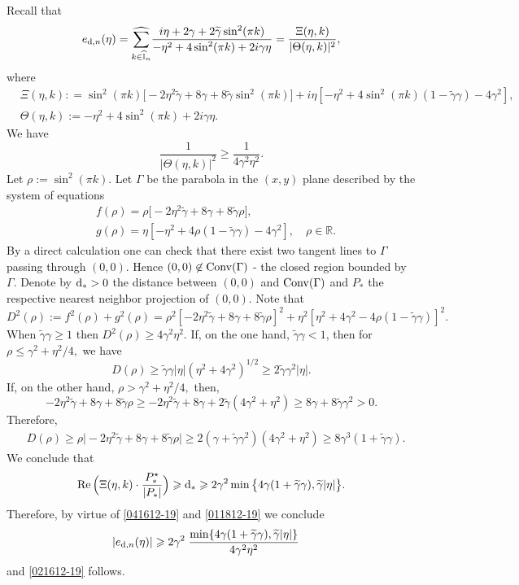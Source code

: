 \documentclass[EJP]{ejpecp} %
\newcommand\R{{\mathbb R}}
\newcommand\T{{\mathbb I}}
\newcommand \ga{\gamma}
\renewcommand{\ge}{\geqslant}
\renewcommand{\le}{\leqslant}
\renewcommand{\hat}{\widehat}
\renewcommand{\tilde}{\widetilde}
\numberwithin{equation}{section}
\begin{document}
Recall that
\begin{align}
\label{041612-19}
e_{{\rm d},n}(\eta)=\underset{{k\in \widehat{\T}_n}}{{\hat\sum}}\frac{i\eta +2\ga+2 \tilde\ga\sin^2(\pi
  k)}{-\eta^2+4\sin^2(\pi
  k)+2i\ga\eta}=\frac{\Xi(\eta,k)}{|\Theta(\eta,k)|^2},
\end{align}
where
\begin{align*}
&\Xi(\eta,k):
=\sin^2(\pi
  k)\big[-2 \eta^2\tilde\ga+8\ga+8 \tilde\ga\sin^2(\pi
  k)\big]+i\eta[-\eta^2+4\sin^2(\pi
  k) (1-\tilde\ga\ga)-4\ga^2],\\
&
\Theta(\eta,k):=-\eta^2+4\sin^2(\pi
  k)+2i\ga\eta.
\end{align*}
We have
\begin{equation}
\label{011812-19}
\frac{1}{|\Theta(\eta,k)|^2}\ge \frac{1}{4\ga^2\eta^2}.
\end{equation}
Let $\rho:=\sin^2(\pi
  k)$.
Let $\Gamma$ be the parabola in the $(x,y)$ plane described by the
system  of equations
\begin{align*}
&
f(\rho)=\rho\big[-2 \eta^2\tilde\ga+8\ga+8 \tilde\ga\rho\big],\\
&
g(\rho)=\eta[-\eta^2+4\rho (1-\tilde\ga\ga)-4\ga^2],\quad \rho\in\R.
\end{align*}
By a direct calculation one can  check that 
there exist two tangent  lines  to $\Gamma$ passing through $(0,0)$.
Hence  $(0,0)\not \in{\rm Conv}(\Gamma) $ - the closed region bounded
by  $\Gamma$. Denote by ${\rm d}_*>0$ the distance between 
$(0,0)$ and ${\rm Conv}(\Gamma) $ and $P_*$ the respective nearest neighbor
projection of $(0,0)$. 
Note that
\begin{equation*}
D^2(\rho):=f^2(\rho)+g^2(\rho)=\rho^2[-2 \eta^2\tilde\ga+8\ga+8
  \tilde\ga\rho]^2
+\eta^2[\eta^2 +4\ga^2-4\rho (1-\tilde\ga\ga)]^2.
\end{equation*}
When $\tilde\ga\ga\ge 1$ then 
$D^2(\rho)\ge 4\ga^2\eta^2.$
If, on the one hand, $\tilde\ga\ga <1$, then for
$
\rho \le \ga^2+\eta^2/4,
$ 
we have
$$
D(\rho)\ge \tilde\ga\ga |\eta|\left(\eta^2 +4\ga^2\right)^{1/2}\ge 2\tilde\ga\ga^2 |\eta|.
$$
If, on the other hand,
$
\rho > \ga^2+\eta^2/4,
$ 
then,
$$
-2 \eta^2\tilde\ga+8\ga+8
  \tilde\ga\rho\ge -2 \eta^2\tilde\ga+8\ga+2
  \tilde\ga (4\ga^2+\eta^2)\ge 8\ga+8
  \tilde\ga \ga^2>0.
$$
Therefore,
\begin{align*}
&D(\rho)\ge \rho\big|-2 \eta^2\tilde\ga+8\ga+8
  \tilde\ga\rho\big|\ge 2(\ga+
  \tilde\ga \ga^2)(4\ga^2+\eta^2)\ge 8\ga^3(1+
  \tilde\ga \ga).
\end{align*}
We conclude that
$$
{\rm Re}\,\Big(\Xi(\eta,k)\cdot  \frac{P^\star_*}{|P_*|}\Big)\ge {\rm d}_*\ge 2\ga^2\min\big\{4\ga(1+
  \tilde\ga \ga), \tilde\ga |\eta|\big\}.
$$
Therefore, by virtue of \eqref{041612-19} and \eqref{011812-19} we
conclude
 \begin{align}
\label{011712-19}
&|e_{{\rm d},n} (\eta)|
\ge 2\ga^2\; \frac{\min\{4\ga(1+
  \tilde\ga \ga), \tilde\ga |\eta|\}}{4\ga^2\eta^2}
\end{align}
and
\eqref{021612-19} follows.
\end{document}
